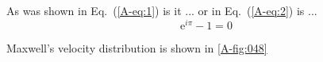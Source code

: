 \documentclass{article}
\begin{document}
  As was shown in Eq.~(\ref{A-eq:1}) is it
  ... or in Eq.~(\ref{A-eq:2}) is ...
  \begin{equation}
    \mathrm{e}^{i\pi}-1=0 \label{eq:x}
  \end{equation}

  Maxwell's velocity distribution is shown in \ref{A-fig:048}
\end{document}
